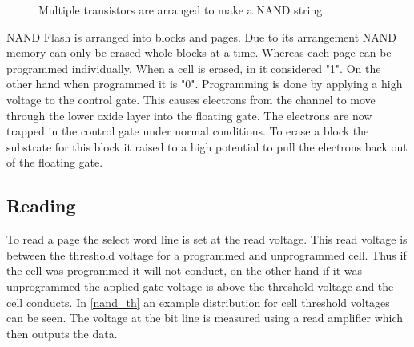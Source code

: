 \begin{figure}
    \centering
    \caption{Multiple transistors are arranged to make a NAND string}
    \label{nand_string}
\end{figure}

NAND Flash is arranged into blocks and pages. Due to its arrangement NAND memory can only be erased whole blocks at a time. Whereas each page can be programmed individually. When a cell is erased, in it considered "1". On the other hand when programmed it is "0". Programming is done by applying a high voltage to the control gate. This causes electrons from the channel to move through the lower oxide layer into the floating gate. The electrons are now trapped in the control gate under normal conditions. To erase a block the substrate for this block it raised to a high potential to pull the electrons back out of the floating gate\cite{RiTo98}.

\subsection{Reading}
To read a page the select word line is set at the read voltage. This read voltage is between the threshold voltage for a programmed and unprogrammed cell. Thus if the cell was programmed it will not conduct, on the other hand if it was unprogrammed the applied gate voltage is above the threshold voltage and the cell conducts. In \cref{nand_th} an example distribution for cell threshold voltages can be seen. The voltage at the bit line is measured using a read amplifier which then outputs the data. 

